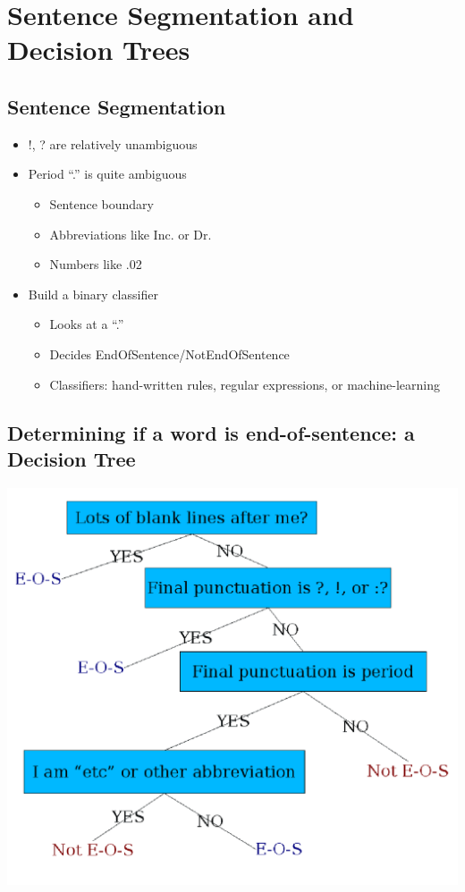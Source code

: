 \documentclass[11pt]{article}
\theoremstyle{definition}
\begin{document}
\section{Sentence Segmentation
and Decision Trees}
\subsection{Sentence Segmentation}
\begin{itemize}
  \item !, ? are relatively unambiguous
  \item Period “.” is quite ambiguous
  \begin{itemize}
    \item Sentence boundary
    \item Abbreviations like Inc. or Dr.
    \item Numbers like .02%
  \end{itemize}
  \item Build a binary classifier
  \begin{itemize}
    \item Looks at a “.”
    \item Decides EndOfSentence/NotEndOfSentence
    \item Classifiers: hand-written rules, regular expressions, or machine-learning
  \end{itemize}
\end{itemize}

\subsection{Determining if a word is end-of-sentence:
a Decision Tree}
\includegraphics[width=\textwidth/2]{6.png}
\end{document}
